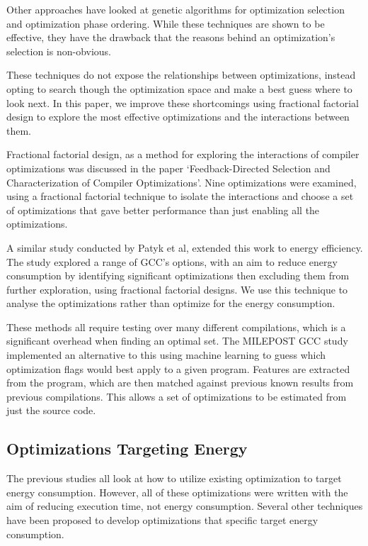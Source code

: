 \documentclass[twocolumn]{article}
\begin{document}
Other approaches have looked at genetic algorithms for optimization selection\cite{Lin2008} and optimization phase ordering\cite{Almagor2004}. While these techniques are shown to be effective, they have the drawback that the reasons behind an optimization's selection is non-obvious.

These techniques do not expose the relationships between optimizations, instead opting to search though the optimization space and make a best guess where to look next. In this paper, we improve these shortcomings using fractional factorial design\cite{BoxHunter} to explore the most effective optimizations and the interactions between them.

Fractional factorial design, as a method for exploring the interactions of compiler optimizations was discussed in the paper `Feedback-Directed Selection and Characterization of Compiler Optimizations'\cite{IntelPaper}. Nine optimizations were examined, using a fractional factorial technique to isolate the interactions and choose a set of optimizations that gave better performance than just enabling all the optimizations.

A similar study conducted by Patyk et al\cite{EnergyReductionCompilerOptions}, extended this work to energy efficiency. The study explored a range of GCC's options, with an aim to reduce energy consumption by identifying significant optimizations then excluding them from further exploration, using fractional factorial designs. We use this technique to analyse the optimizations rather than optimize for the energy consumption.

These methods all require testing over many different compilations, which is a significant overhead when finding an optimal set. The MILEPOST GCC\cite{Fursin2011} study implemented an alternative to this using machine learning to guess which optimization flags would best apply to a given program. Features are extracted from the program, which are then matched against previous known results from previous compilations. This allows a set of optimizations to be estimated from just the source code.

\subsection{Optimizations Targeting Energy}

The previous studies all look at how to utilize existing optimization to target energy consumption. However, all of these optimizations were written with the aim of reducing execution time, not energy consumption. Several other techniques have been proposed to develop optimizations that specific target energy consumption.
\end{document}

